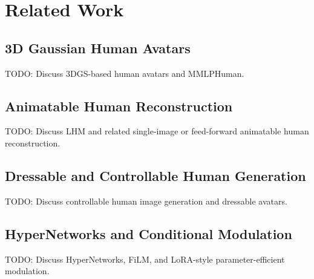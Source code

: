 \section{Related Work}

\subsection{3D Gaussian Human Avatars}
TODO: Discuss 3DGS-based human avatars and MMLPHuman.

\subsection{Animatable Human Reconstruction}
TODO: Discuss LHM and related single-image or feed-forward animatable human reconstruction.

\subsection{Dressable and Controllable Human Generation}
TODO: Discuss controllable human image generation and dressable avatars.

\subsection{HyperNetworks and Conditional Modulation}
TODO: Discuss HyperNetworks, FiLM, and LoRA-style parameter-efficient modulation.
